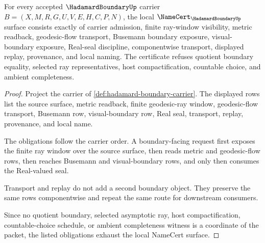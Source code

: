 \begin{theorem}
\label{thm:hadamard-boundary-namecert-obligations}
For every accepted $\HadamardBoundaryUp$ carrier $B=(X,M,R,G,U,V,E,H,C,P,N)$, the local $\NameCert_{\HadamardBoundaryUp}$ surface consists exactly of carrier admission, finite ray-window visibility, metric readback, geodesic-flow transport, Busemann boundary exposure, visual-boundary exposure, Real-seal discipline, componentwise transport, displayed replay, provenance, and local naming. The certificate refuses quotient boundary equality, selected ray representatives, host compactification, countable choice, and ambient completeness.
\end{theorem}
\begin{proof}
Project the carrier of \autoref{def:hadamard-boundary-carrier}. The displayed rows list the source surface, metric readback, finite geodesic-ray window, geodesic-flow transport, Busemann row, visual-boundary row, Real seal, transport, replay, provenance, and local name.

The obligations follow the carrier order. A boundary-facing request first exposes the finite ray window over the source surface, then reads metric and geodesic-flow rows, then reaches Busemann and visual-boundary rows, and only then consumes the Real-valued seal.

Transport and replay do not add a second boundary object. They preserve the same rows componentwise and repeat the same route for downstream consumers.

Since no quotient boundary, selected asymptotic ray, host compactification, countable-choice schedule, or ambient completeness witness is a coordinate of the packet, the listed obligations exhaust the local NameCert surface.
\end{proof}

